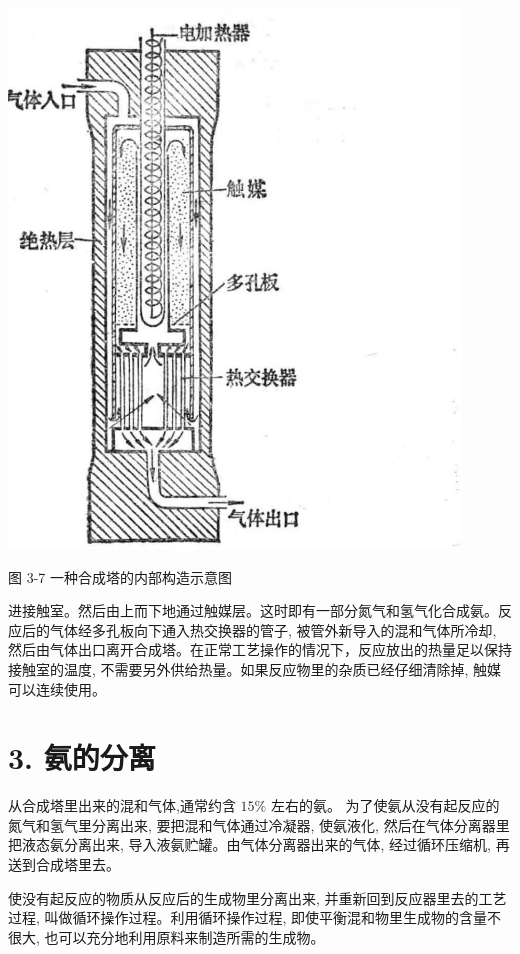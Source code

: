 \documentclass[10pt]{article}
\begin{document}
\begin{center}
\includegraphics[max width=0.9\textwidth]{images/01912d13-9986-7822-a012-3f3f7be99dcb_96_587411.jpg}
\end{center}

图 3-7 一种合成塔的内部构造示意图

进接触室。然后由上而下地通过触媒层。这时即有一部分氮气和氢气化合成氨。反应后的气体经多孔板向下通入热交换器的管子, 被管外新导入的混和气体所冷却, 然后由气体出口离开合成塔。在正常工艺操作的情况下，反应放出的热量足以保持接触室的温度, 不需要另外供给热量。如果反应物里的杂质已经仔细清除掉, 触媒可以连续使用。

\section*{3. 氨的分离}

从合成塔里出来的混和气体,通常约含 \({15}\%\) 左右的氨。 为了使氨从没有起反应的氮气和氢气里分离出来, 要把混和气体通过冷凝器, 使氨液化, 然后在气体分离器里把液态氨分离出来, 导入液氨贮罐。由气体分离器出来的气体, 经过循环压缩机, 再送到合成塔里去。

使没有起反应的物质从反应后的生成物里分离出来, 并重新回到反应器里去的工艺过程, 叫做循环操作过程。利用循环操作过程, 即使平衡混和物里生成物的含量不很大, 也可以充分地利用原料来制造所需的生成物。
\end{document}
